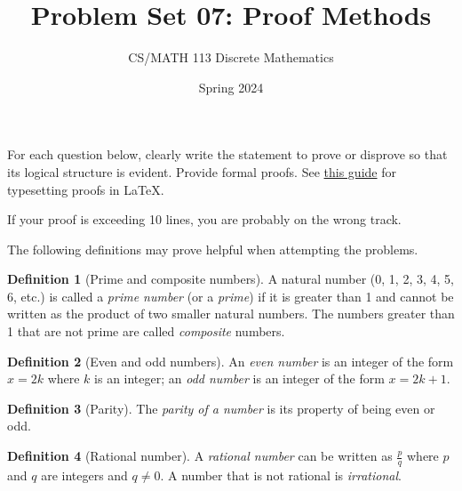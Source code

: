 \documentclass[a4paper]{exam}
\title{Problem Set 07: Proof Methods}
\author{CS/MATH 113 Discrete Mathematics}
\date{Spring 2024}
\theoremstyle{definition}
\newtheorem{definition}{Definition}
\begin{document}
\maketitle

For each question below, clearly write the statement to prove or disprove so that its logical structure is evident. Provide formal proofs. See \href{https://www.overleaf.com/learn/latex/Theorems_and_proofs#Proofs}{this guide} for typesetting proofs in \LaTeX.

If your proof is exceeding 10 lines, you are probably on the wrong track.

The following definitions may prove helpful when attempting the problems.

\begin{definition}[Prime and composite numbers]
A natural number (0, 1, 2, 3, 4, 5, 6, etc.) is called a \textit{prime number} (or a \textit{prime}) if it is greater than 1 and cannot be written as the product of two smaller natural numbers. The numbers greater than 1 that are not prime are called \textit{composite} numbers.  
\end{definition}

\begin{definition}[Even and odd numbers]
An \textit{even number} is an integer of the form $x=2k$ where $k$ is an integer; an \textit{odd number} is an integer of the form $x=2k+1$.  
\end{definition}

\begin{definition}[Parity]
The \textit{parity of a number} is its property of being even or odd.
\end{definition}

\begin{definition}[Rational number]
A \textit{rational number} can be written as $\frac{p}{q}$ where $p$ and $q$ are integers and $q\neq 0$. A number that is not rational is \textit{irrational}.
\end{definition}
\end{document}
